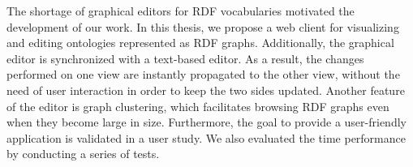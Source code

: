 \abstract

The shortage of graphical editors for RDF vocabularies motivated the development of our work. In this thesis, we propose a web client for visualizing and editing ontologies represented as RDF graphs. Additionally, the graphical editor is synchronized with a text-based editor. As a result, the changes performed on one view are instantly propagated to the other view, without the need of user interaction in order to keep the two sides updated. Another feature of the editor is graph clustering, which facilitates browsing RDF graphs even when they become large in size.  Furthermore, the goal to provide a user-friendly application is validated in a user study. We also evaluated the time performance by conducting a series of tests.


